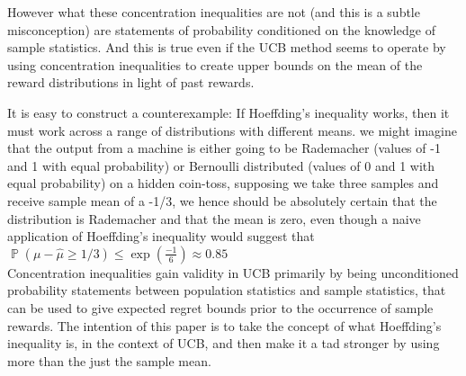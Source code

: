\documentclass[12pt]{colt2020} %
\DeclareMathOperator{\p}{\mathbb{P}}
\begin{document}
However what these concentration inequalities are not (and this is a subtle misconception) are statements of probability conditioned on the knowledge of sample statistics. And this is true even if the UCB method seems to operate by using concentration inequalities to create upper bounds on the mean of the reward distributions in light of past rewards.

It is easy to construct a counterexample: If Hoeffding's inequality works, then it must work across a range of distributions with different means.
we might imagine that the output from a machine is either going to be Rademacher (values of -1 and 1 with equal probability) or Bernoulli distributed (values of 0 and 1 with equal probability) on a hidden coin-toss, supposing we take three samples and receive sample mean of a -1/3, we hence should be absolutely certain that the distribution is Rademacher and that the mean is zero, even though a naive application of Hoeffding's inequality would suggest that $\p(\mu-\hat{\mu}\ge 1/3)\le \exp\left(\frac{-1}{6}\right) \approx 0.85 $\\

Concentration inequalities gain validity in UCB primarily by being unconditioned probability statements between population statistics and sample statistics, that can be used to give expected regret bounds prior to the occurrence of sample rewards. The intention of this paper is to take the concept of what Hoeffding's inequality is, in the context of UCB, and then make it a tad stronger by using more than the just the sample mean.
\end{document}
